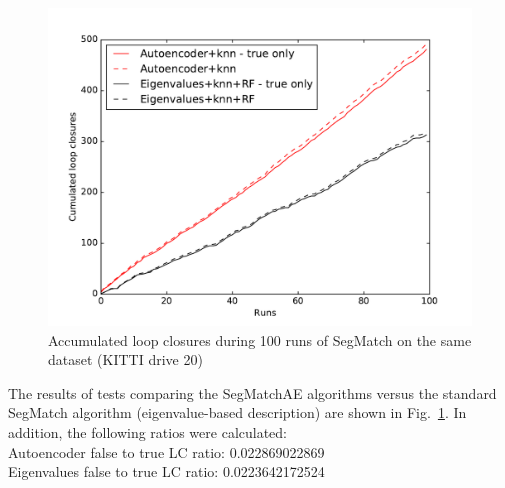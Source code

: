 \begin{figure}
  \centering
  \includegraphics[width=5.2in]{images/kitti20performance.pdf}
  \caption{Accumulated loop closures during 100 runs of SegMatch on the same dataset (KITTI drive 20)}
  \label{fig:kitti20-performance}
\end{figure}

The results of tests comparing the SegMatchAE algorithms versus the standard SegMatch algorithm (eigenvalue-based description) are shown in Fig.~\ref{fig:kitti20-performance}. In addition, the following ratios were calculated:\\

Autoencoder false to true LC ratio: 0.022869022869\\
Eigenvalues false to true LC ratio: 0.0223642172524\\

